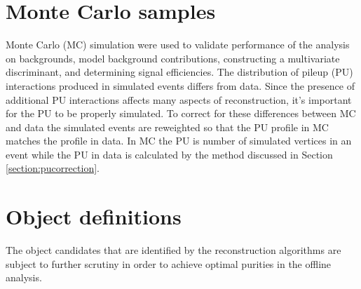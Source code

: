 \section{Monte Carlo samples}
Monte Carlo (MC) simulation were used to validate performance of the analysis on backgrounds, model background contributions, constructing a multivariate discriminant, and determining signal efficiencies.   %
The distribution of pileup (PU) interactions produced in simulated events differs from data.  Since the presence of additional PU interactions affects many aspects of reconstruction, it's important for the PU to be properly simulated.  To correct for these differences between MC and data the simulated events are reweighted so that the PU profile in MC matches the profile in data.  In MC the PU is number of simulated vertices in an event while the PU in data is calculated by the method discussed in Section \ref{section:pucorrection}.  
  

\section{Object definitions}
The object candidates that are identified by the reconstruction algorithms are subject to further scrutiny in order to achieve optimal purities in the offline analysis.  

